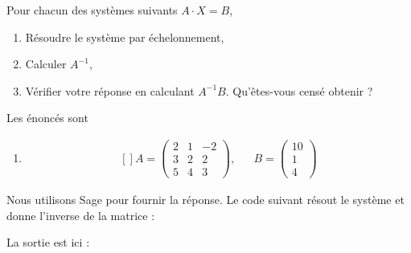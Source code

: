 \begin{example}     \label{ExBGCEooPIQgGW}
    

	Pour chacun des systèmes suivants $A\cdot X=B$,
	\begin{enumerate}

		\item
			Résoudre le système par échelonnement,
		\item
			Calculer $A^{-1}$,
		\item
			Vérifier votre réponse en calculant $A^{-1}B$. Qu'êtes-vous censé obtenir ?

	\end{enumerate}

	Les énoncés sont
	\begin{enumerate}

		\item
			\begin{equation}
				\begin{aligned}[]
					A=\begin{pmatrix}
						2	&	1	&	-2	\\
						3	&	2	&	2	\\
						5	&	4	&	3
					\end{pmatrix},
					&&B=\begin{pmatrix}
						10	\\ 
						1	\\ 
						4	
					\end{pmatrix}
				\end{aligned}
			\end{equation}
	\end{enumerate}


	Nous utilisons Sage pour fournir la réponse. Le code suivant résout le système et donne l'inverse de la matrice :



La sortie est ici :




\end{example}

